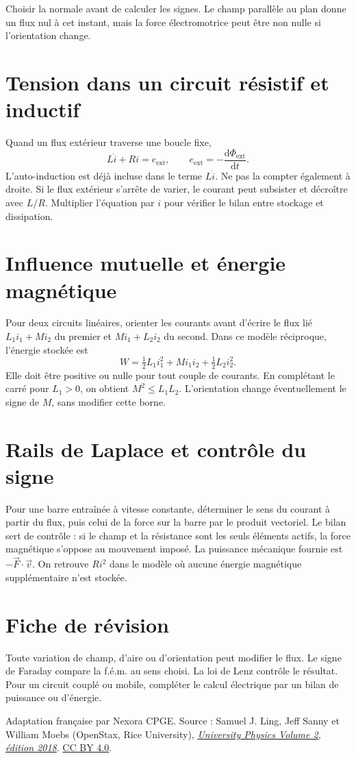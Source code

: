 \documentclass[11pt,a4paper]{article}
\begin{document}
Choisir la normale avant de calculer les signes. Le champ parallèle au plan donne un flux nul à cet instant, mais la force électromotrice peut être non nulle si l’orientation change.

\section*{Tension dans un circuit résistif et inductif}
Quand un flux extérieur traverse une boucle fixe,
\[ L\dot i+Ri=e_{\mathrm{ext}},\qquad e_{\mathrm{ext}}=-\frac{\mathrm d\Phi_{\mathrm{ext}}}{\mathrm dt}. \]
L’auto-induction est déjà incluse dans le terme $L\dot i$. Ne pas la compter également à droite. Si le flux extérieur s’arrête de varier, le courant peut subsister et décroître avec $L/R$. Multiplier l’équation par $i$ pour vérifier le bilan entre stockage et dissipation.

\section*{Influence mutuelle et énergie magnétique}
Pour deux circuits linéaires, orienter les courants avant d’écrire le flux lié $L_1i_1+Mi_2$ du premier et $Mi_1+L_2i_2$ du second. Dans ce modèle réciproque, l’énergie stockée est
\[ W=\tfrac12L_1i_1^2+Mi_1i_2+\tfrac12L_2i_2^2. \]
Elle doit être positive ou nulle pour tout couple de courants. En complétant le carré pour $L_1>0$, on obtient $M^2\le L_1L_2$. L’orientation change éventuellement le signe de $M$, sans modifier cette borne.

\section*{Rails de Laplace et contrôle du signe}
Pour une barre entraînée à vitesse constante, déterminer le sens du courant à partir du flux, puis celui de la force sur la barre par le produit vectoriel. Le bilan sert de contrôle : si le champ et la résistance sont les seuls éléments actifs, la force magnétique s’oppose au mouvement imposé. La puissance mécanique fournie est $-\vec F\cdot\vec v$. On retrouve $Ri^2$ dans le modèle où aucune énergie magnétique supplémentaire n’est stockée.

\section*{Fiche de révision}
Toute variation de champ, d’aire ou d’orientation peut modifier le flux. Le signe de Faraday compare la f.é.m. au sens choisi. La loi de Lenz contrôle le résultat. Pour un circuit couplé ou mobile, compléter le calcul électrique par un bilan de puissance ou d’énergie.

\bigskip
{\footnotesize Adaptation française par Nexora CPGE. Source : Samuel J. Ling, Jeff Sanny et William Moebs (OpenStax, Rice University),
\href{https://d3bxy9euw4e147.cloudfront.net/oscms-prod/media/documents/UniversityPhysicsVolume2-OP.pdf\#page=592}{\textit{University Physics Volume 2, édition 2018}}.
\href{https://creativecommons.org/licenses/by/4.0/}{CC BY 4.0}.}
\end{document}
